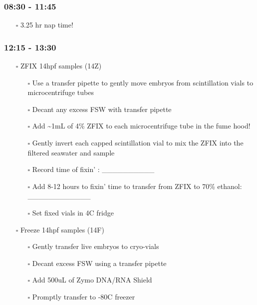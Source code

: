 \documentclass[
  letterpaper,
  DIV=11,
  numbers=noendperiod]{scrartcl}
\providecommand{\tightlist}{%
  \setlength{\itemsep}{0pt}\setlength{\parskip}{0pt}}\usepackage{longtable,booktabs,array}
\begin{document}
\hypertarget{section-9}{%
\subsubsection{08:30 - 11:45}\label{section-9}}

\begin{itemize}
\tightlist
\item[$\square$]
  3.25 hr nap time!
\end{itemize}

\hypertarget{section-10}{%
\subsubsection{12:15 - 13:30}\label{section-10}}

\begin{itemize}
\item[$\square$]
  ZFIX 14hpf samples (14Z)

  \begin{itemize}
  \tightlist
  \item[$\square$]
    Use a transfer pipette to gently move embryos from scintillation
    vials to microcentrifuge tubes
  \item[$\square$]
    Decant any excess FSW with transfer pipette
  \item[$\square$]
    Add \textasciitilde1mL of 4\% ZFIX to each microcentrifuge tube in
    the fume hood!
  \item[$\square$]
    Gently invert each capped scintillation vial to mix the ZFIX into
    the filtered seawater and sample
  \item[$\square$]
    Record time of fixin' : \_\_\_\_\_\_\_\_\_\_
  \item[$\square$]
    Add 8-12 hours to fixin' time to transfer from ZFIX to 70\% ethanol:
    \_\_\_\_\_\_\_\_\_\_\_\_
  \item[$\square$]
    Set fixed vials in 4C fridge
  \end{itemize}
\item[$\square$]
  Freeze 14hpf samples (14F)

  \begin{itemize}
  \item[$\square$]
    Gently transfer live embryos to cryo-vials
  \item[$\square$]
    Decant excess FSW using a transfer pipette
  \item[$\square$]
    Add 500uL of Zymo DNA/RNA Shield
  \item[$\square$]
    Promptly transfer to -80C freezer
  \end{itemize}
\end{itemize}
\end{document}
